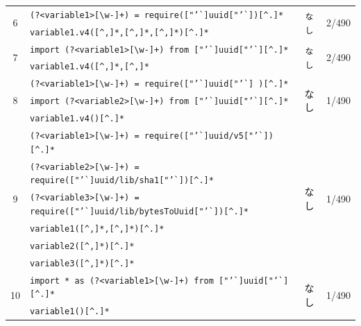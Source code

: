 \documentclass[11pt]{jreport}
\begin{document}
\begin{table}[t]
{\begin{tabular}{c|l|c|r}
            \multirow{2}{*}{6} & \texttt{(?\textless{}variable1\textgreater{}{[}\textbackslash{}w-{]}+) = require(["'\`{}]uuid["'\`{}])[\^{}.]*} & \multirow{2}{*}{\texttt{なし}}  &  \multirow{2}{*}{2/490} \\ \cline{2-2}
            & \texttt{variable1.v4([\textasciicircum,]*,[\textasciicircum,]*,[\textasciicircum,]*)[\^{}.]*} & & \\ \hline

            \multirow{2}{*}{7} & \texttt{import (?\textless{}variable1\textgreater{}{[}\textbackslash{}w-{]}+) from ["'\`{}]uuid["'\`{}][\^{}.]*} & \multirow{2}{*}{\texttt{なし}}  &  \multirow{2}{*}{2/490} \\ \cline{2-2}
            & \texttt{variable1.v4([\textasciicircum,]*,[\textasciicircum,]*} & & \\ \hline
            
            \multirow{3}{*}{8} & \texttt{(?\textless{}variable1\textgreater{}{[}\textbackslash{}w-{]}+) = require(["'\`{}]uuid["'\`{}] )[\^{}.]*} & \multirow{3}{*}{なし} & \multirow{3}{*}{1/490} \\ 
            & \texttt{import (?\textless{}variable2\textgreater{}{[}\textbackslash{}w-{]}+) from ["'\`{}]uuid["'\`{}][\^{}.]*} & & \\ \cline{2-2}
            & \texttt{variable1.v4()[\^{}.]*} & & \\ \hline
            
            \multirow{6}{*}{9} & \texttt{(?\textless{}variable1\textgreater{}{[}\textbackslash{}w-{]}+) = require(["'\`{}]uuid/v5["'\`{}])[\^{}.]*} & \multirow{6}{*}{なし} & \multirow{6}{*}{1/490} \\ 
            & \texttt{(?\textless{}variable2\textgreater{}{[}\textbackslash{}w-{]}+) = require(["'\`{}]uuid/lib/sha1["'\`{}])[\^{}.]*} & & \\
            & \texttt{(?\textless{}variable3\textgreater{}{[}\textbackslash{}w-{]}+) = require(["'\`{}]uuid/lib/bytesToUuid["'\`{}])[\^{}.]*} & & \\ \cline{2-2}
            & \texttt{variable1([\textasciicircum,]*,[\textasciicircum,]*)[\^{}.]*}& & \\ 
            & \texttt{variable2([\textasciicircum,]*)[\^{}.]*}& & \\
            & \texttt{variable3([\textasciicircum,]*)[\^{}.]*}& & \\ \hline

            \multirow{2}{*}{10} & \texttt{import * as (?\textless{}variable1\textgreater{}{[}\textbackslash{}w-{]}+) from ["'\`{}]uuid["'\`{}][\^{}.]*} & \multirow{2}{*}{なし}  &  \multirow{2}{*}{1/490} \\ \cline{2-2}
            & \texttt{variable1()[\^{}.]*} & & \\ \hline


\end{tabular}}
\end{table}
\end{document}
